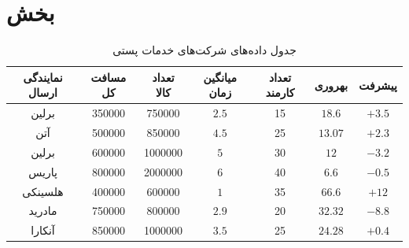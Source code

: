\documentclass[11pt, oneside]{book}
\begin{document}
\section{بخش }
\begin{table}[H]
\begin{center}
\caption{جدول داده‌های شرکت‌های خدمات پستی}
\begin{adjustbox}{width=\textwidth}
\begin{tabular}{|c|c|c|c|c|c|c|}
\hline
نمایندگی ارسال &
مسافت کل &
تعداد کالا &
میانگین زمان &
تعداد کارمند &
بهروری &
پیشرفت \\
\hline
\hline
برلین &
350000&
750000&
$2.5$&
15 &
$18.6$&
$+3.5$\\
\hline
آتن &
500000&
850000&
$4.5$&
25&
$13.07$&
$+2.3$\\
\hline
برلین &
600000&
1000000&
$5$&
30&
$12$&
$-3.2$\\
\hline
پاریس &
800000&
2000000&
$6$&
40&
$6.6$&
$-0.5$\\
\hline
هلسینکی &
400000&
600000&
$1$&
35&
$66.6$&
$+12$\\
\hline
مادرید &
750000&
800000&
$2.9$&
20 &
$32.32$&
$-8.8$\\
\hline
آنکارا &
850000&
1000000&
$3.5$&
25&
$24.28$&
$+0.4$\\
\hline
\end{tabular}
\end{adjustbox}
\end{center}
\end{table}

\listoftables
\end{document}

